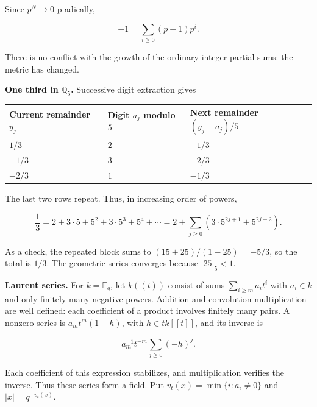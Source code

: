 \documentclass[
  english,
  11pt,
  a4paper,
]{article}
\newcounter{none} %
\begin{document}
Since \(p^N\to0\) p-adically,

\[-1=\sum_{i\ge0}(p-1)p^i.\]

There is no conflict with the growth of the ordinary integer partial
sums: the metric has changed.

\textbf{One third in \(\mathbb Q_5\).} Successive digit extraction gives

{\def\LTcaptype{none} %
\begin{longtable}[]{@{}
  >{\raggedright\arraybackslash}p{}
  >{\raggedleft\arraybackslash}p{}
  >{\raggedright\arraybackslash}p{}@{}}
\toprule\noalign{}
\begin{minipage}[b]{\linewidth}\raggedright
Current remainder \(y_j\)
\end{minipage} & \begin{minipage}[b]{\linewidth}\raggedleft
Digit \(a_j\) modulo \(5\)
\end{minipage} & \begin{minipage}[b]{\linewidth}\raggedright
Next remainder \((y_j-a_j)/5\)
\end{minipage} \\
\midrule\noalign{}
\endhead
\bottomrule\noalign{}
\endlastfoot
\(1/3\) & \(2\) & \(-1/3\) \\
\(-1/3\) & \(3\) & \(-2/3\) \\
\(-2/3\) & \(1\) & \(-1/3\) \\
\end{longtable}
}

The last two rows repeat. Thus, in increasing order of powers,

\[\frac13=2+3\cdot5+5^2+3\cdot5^3+5^4+\cdots
=2+\sum_{j\ge0}(3\cdot5^{2j+1}+5^{2j+2}).\]

As a check, the repeated block sums to \((15+25)/(1-25)=-5/3\), so the
total is \(1/3\). The geometric series converges because \(|25|_5<1\).

\textbf{Laurent series.} For \(k=\mathbb F_q\), let \(k((t))\) consist
of sums \(\sum_{i\ge m}a_it^i\) with \(a_i\in k\) and only finitely many
negative powers. Addition and convolution multiplication are well
defined: each coefficient of a product involves finitely many pairs. A
nonzero series is \(a_mt^m(1+h)\), with \(h\in tk[[t]]\), and its
inverse is

\[a_m^{-1}t^{-m}\sum_{j\ge0}(-h)^j.\]

Each coefficient of this expression stabilizes, and multiplication
verifies the inverse. Thus these series form a field. Put
\(v_t(x)=\min\{i:a_i\ne0\}\) and \(|x|=q^{-v_t(x)}\).
\end{document}
